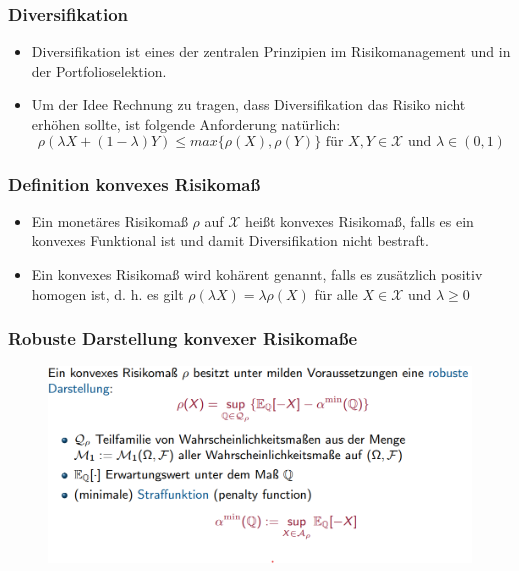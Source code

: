 \documentclass[12pt]{report}
\theoremstyle{dotless}
\theoremstyle{definition}
\begin{document}
\subsubsection{Diversifikation}
\begin{itemize}
\item Diversifikation ist eines der zentralen Prinzipien im Risikomanagement und in
der Portfolioselektion.
\item Um der Idee Rechnung zu tragen, dass Diversifikation das Risiko nicht
erhöhen sollte, ist folgende Anforderung natürlich:
\begin{equation}
\rho(\lambda X + (1-\lambda)Y) \leq max \{ \rho(X), \rho(Y)\} \text{ für } X,Y \in \mathcal{X} \text{ und } \lambda\in (0,1)
\end{equation}
\end{itemize}


\subsubsection{Definition konvexes Risikomaß}
\begin{itemize}
\item Ein monetäres Risikomaß $\rho$ auf $\mathcal{X}$ heißt konvexes Risikomaß, falls es ein konvexes Funktional ist und damit Diversifikation nicht bestraft.
\item Ein konvexes Risikomaß wird kohärent genannt, falls es zusätzlich positiv
homogen ist, d. h. es gilt $\rho(\lambda X) = \lambda\rho(X)$ für alle $X \in \mathcal{X}$ und $\lambda\geq 0$
\end{itemize}


\subsubsection{Robuste Darstellung konvexer Risikomaße}

\begin{figure}[ht]
	\centering
	\includegraphics[width=0.9 \textwidth]{Bilder/robust.png}
\end{figure}
\end{document}
